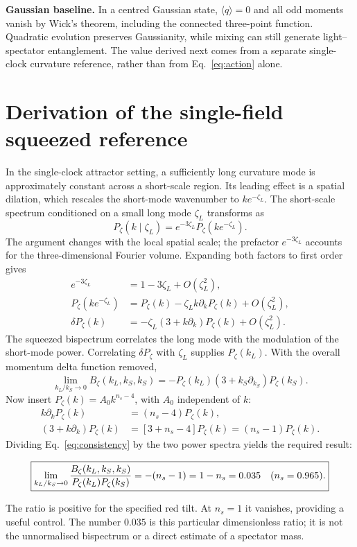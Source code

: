 \documentclass[11pt,a4paper]{article}
\begin{document}
\textbf{Gaussian baseline.} In a centred Gaussian state, $\langle q\rangle=0$ and all odd moments vanish by Wick's theorem, including the connected three-point function. Quadratic evolution preserves Gaussianity, while mixing can still generate light--spectator entanglement. The value derived next comes from a separate single-clock curvature reference, rather than from Eq.~\eqref{eq:action} alone.

\newpage
\section{Derivation of the single-field squeezed reference}
In the single-clock attractor setting, a sufficiently long curvature mode is approximately constant across a short-scale region. Its leading effect is a spatial dilation, which rescales the short-mode wavenumber to $ke^{-\zeta_L}$. The short-scale spectrum conditioned on a small long mode $\zeta_L$ transforms as~\cite{maldacena,creminelli}
\begin{equation}
P_\zeta(k\mid\zeta_L)=e^{-3\zeta_L}P_\zeta(ke^{-\zeta_L}).
\label{eq:dilation}
\end{equation}
The argument changes with the local spatial scale; the prefactor $e^{-3\zeta_L}$ accounts for the three-dimensional Fourier volume. Expanding both factors to first order gives
\begin{align}
e^{-3\zeta_L}&=1-3\zeta_L+O(\zeta_L^2),\\
P_\zeta(ke^{-\zeta_L})&=P_\zeta(k)-\zeta_L k\partial_kP_\zeta(k)+O(\zeta_L^2),\\
\delta P_\zeta(k)&=-\zeta_L(3+k\partial_k)P_\zeta(k)+O(\zeta_L^2).
\label{eq:delta}
\end{align}
The squeezed bispectrum correlates the long mode with the modulation of the short-mode power. Correlating $\delta P_\zeta$ with $\zeta_L$ supplies $P_\zeta(k_L)$. With the overall momentum delta function removed,
\begin{equation}
\lim_{k_L/k_S\to0}B_\zeta(k_L,k_S,k_S)
=-P_\zeta(k_L)(3+k_S\partial_{k_S})P_\zeta(k_S).
\label{eq:consistency}
\end{equation}
Now insert $P_\zeta(k)=A_0k^{n_s-4}$, with $A_0$ independent of $k$:
\begin{align}
k\partial_kP_\zeta(k)&=(n_s-4)P_\zeta(k),\\
(3+k\partial_k)P_\zeta(k)&=[3+n_s-4]P_\zeta(k)
=(n_s-1)P_\zeta(k).
\end{align}
Dividing Eq.~\eqref{eq:consistency} by the two power spectra yields the required result:
\begin{tcolorbox}
\begin{equation}
\boxed{\lim_{k_L/k_S\to0}
\frac{B_\zeta(k_L,k_S,k_S)}{P_\zeta(k_L)P_\zeta(k_S)}
=-(n_s-1)=1-n_s=0.035\quad(n_s=0.965).}
\end{equation}
\end{tcolorbox}
The ratio is positive for the specified red tilt. At $n_s=1$ it vanishes, providing a useful control. The number $0.035$ is this particular dimensionless ratio; it is not the unnormalised bispectrum or a direct estimate of a spectator mass.
\end{document}
